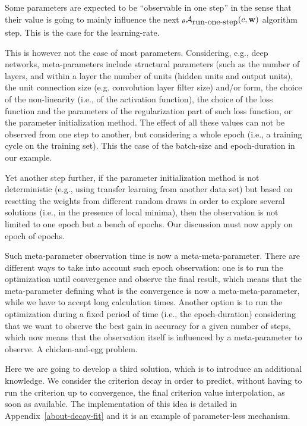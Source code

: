\documentclass{article}
\begin{document}
Some parameters are expected to be ``observable in one step'' in the sense that their value is going to mainly influence the next ${}_{\bf \theta}{\cal A}_{\mbox{run-one-step}}(c, {\bf w})$ algorithm step. This is the case for the learning-rate.

This is however not the case of most parameters. Considering, e.g., deep networks, meta-parameters include structural parameters (such as the number of layers, and within a layer the number of units (hidden units and output units), the unit connection size (e.g. convolution layer filter size) and/or form, the choice of the non-linearity (i.e., of the activation function), the choice of the loss function and the parameters of the regularization part of such loss function, or the parameter initialization method. The effect of all these values can not be observed from one step to another, but considering a whole epoch (i.e., a training cycle on the training set). This the case of the batch-size and epoch-duration in our example. 

Yet another step further, if the parameter initialization method is not deterministic (e.g., using transfer learning from another data set) but based on resetting the weights from different random draws in order to explore several solutions (i.e., in the presence of local minima), then the observation is not limited to one epoch but a bench of epochs. Our discussion must now apply on epoch of epochs.

Such meta-parameter observation time is now a meta-meta-parameter. There are different ways to take into account such epoch observation: one is to run the optimization until convergence and observe the final result, which means that the meta-parameter defining what is the convergence is now a meta-meta-parameter, while we have to accept long calculation times. Another option is to run the optimization during a fixed period of time (i.e., the epoch-duration) considering that we want to observe the best gain in accuracy for a given number of steps, which now means that the observation itself is influenced by a meta-parameter to observe. A chicken-and-egg problem.

Here we are going to develop a third solution, which is to introduce an additional knowledge. We consider the criterion decay in order to predict, without having to run the criterion up to convergence, the final criterion value interpolation, as soon as available. The implementation of this idea is detailed in Appendix~\ref{about-decay-fit} and it is an example of parameter-less mechanism.
\end{document}
